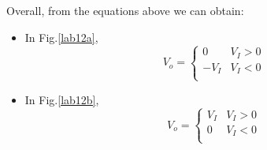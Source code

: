         Overall, from the equations above we can obtain:\\
            \begin{itemize}
                \item In Fig.\ref{lab12a},
                    \begin{equation*}
                    V_o =
                        \begin{cases}
                            0 & V_I>0\\
                            -V_I & V_I<0\\
                        \end{cases}
                    \end{equation*}
                \item In Fig.\ref{lab12b},
                    \begin{equation*}
                    V_o =
                        \begin{cases}
                            V_I & V_I>0\\
                            0 & V_I<0\\
                        \end{cases}
                    \end{equation*}
            \end{itemize}

